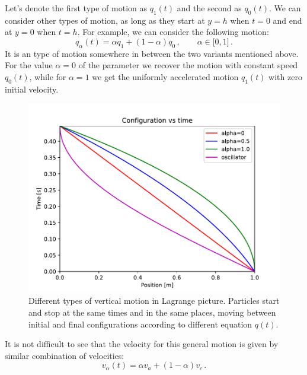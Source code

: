 Let's denote the first type of motion as $q_1(t)$ and the second as
$q_0(t)$. We can consider other types of motion, as long as they start
at $y=h$ when $t=0$ and end at $y=0$ when $t=h$. For example, we can
consider the following motion:
\[
q_\alpha(t) = \alpha q_1 + (1-\alpha) q_0\,,\qquad \alpha \in\lbrack
0, 1\rbrack\,.
\]
It is an type of motion somewhere in between the two variants
mentioned above. For the value
$\alpha=0$ of the parameter we recover the motion with constant speed
$q_0(t)$, while for $\alpha=1$ we get the uniformly accelerated motion
$q_1(t)$ with zero initial velocity.
\begin{figure}[htbp]
	\centering
	\includegraphics[scale=0.7]{lagrange_vertical}
	\caption{Different types of vertical motion in Lagrange
		picture. Particles start and stop at the same times and in the
		same places, moving between initial and final configurations
		according to different equation $q(t)$.}
	\label{fig:lagrange_vertical}
\end{figure}


It is not difficult to see that the velocity for this general motion
is given by similar combination of velocities:
\[
v_\alpha(t) = \alpha v_a + (1-\alpha)v_c\,.
\]

